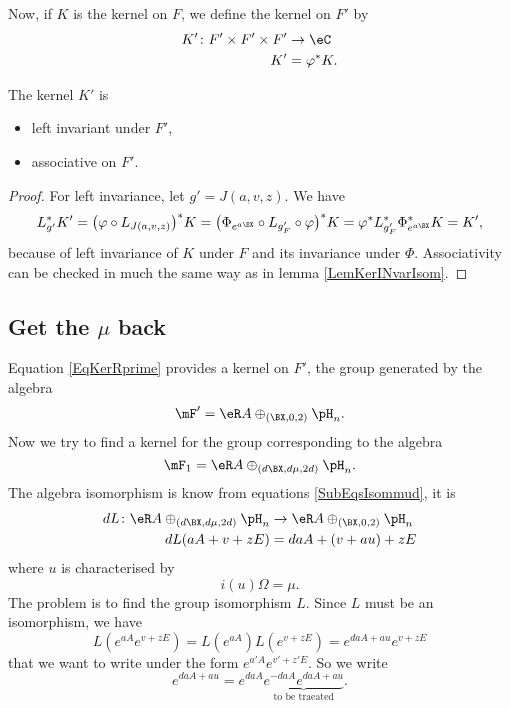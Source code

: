 Now, if $K$ is the kernel on $F$, we define the kernel on $F'$ by
\begin{equation}\label{EqKerRprime}
\begin{aligned}
 K'\colon F'\times F'\times F'&\to \eC\\
K'&=\varphi^*K. 
\end{aligned}
\end{equation}


\begin{theorem} 
The kernel $K'$ is
\begin{itemize}
\item left invariant under $F'$,
\item associative on $F'$.
\end{itemize}
 \label{ThoDefoHeizAvecB}
\end{theorem}
\begin{proof}
For left invariance, let $g'=J(a,v,z)$. We have
\[ 
  L_{g'}^*K'=\big( \varphi\circ L_{J(a,v,z)} \big)^*K=\big( \Phi_{ e^{a\BX}}\circ L_{g'_F}\circ\varphi \big)^*K=\varphi^*L_{g'_F}^*\Phi_{ e^{a\BX}}^*K=K',
\]
because of left invariance of $K$ under $F$ and its invariance under $\Phi$. Associativity can be checked in much the same way as in lemma \ref{LemKerINvarIsom}.
\end{proof}

\subsection{Get the \texorpdfstring{$\mu$}{u} back}  \label{SubSecRemetreMu}

Equation \eqref{EqKerRprime} provides a kernel on $F'$, the group generated by the algebra
\[ 
  \mF'=\eR A\oplus_{(\BX ,0,2)}\pH_{n}.
\]
Now we try to find a kernel for the group corresponding to the algebra 
\[ 
  \mF_{1}=\eR A\oplus_{(d\BX ,d\mu,2d)}\pH_{n}.
\]
The algebra isomorphism is know from equations \eqref{SubEqsIsommud}, it is
\begin{equation}
\begin{aligned}
 dL\colon \eR A\oplus_{(d\BX ,d\mu,2d)}\pH_{n}&\to \eR A\oplus_{(\BX ,0,2)}\pH_{n} \\ 
dL(aA+v+zE)&=daA+(v+au)+zE 
\end{aligned}
\end{equation}
where $u$ is characterised by
\[ 
  i(u)\Omega=\mu.
\]
The problem is to find the group isomorphism $L$. Since $L$ must be an isomorphism, we have
\[ 
L( e^{aA} e^{v+zE})=L( e^{aA})L( e^{v+zE})
		= e^{daA+au} e^{v+zE}
\]
that we want to write under the form $ e^{a'A} e^{v'+z'E}$. So we write
\[ 
   e^{daA+au}= e^{daA}\underbrace{e^{-daA} e^{daA+au}}_{\text{to be traeated}}.
\]


